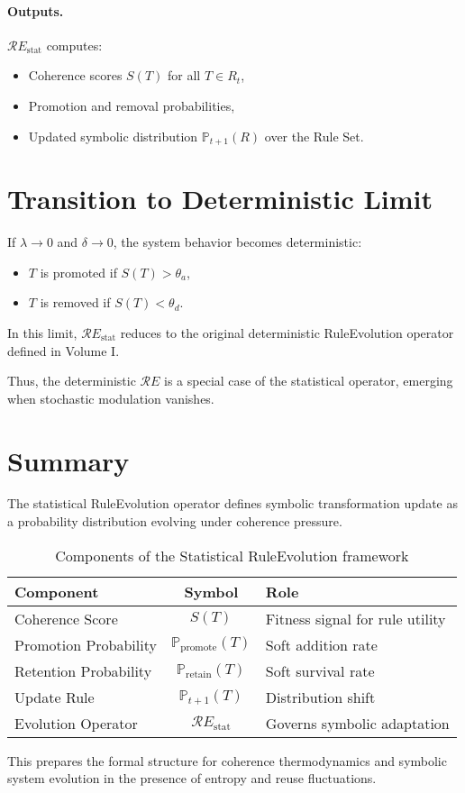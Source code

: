 \paragraph{Outputs.}
$\mathcal{R}E_{\text{stat}}$ computes:
\begin{itemize}
    \item Coherence scores $S(T)$ for all $T \in R_t$,
    \item Promotion and removal probabilities,
    \item Updated symbolic distribution $\mathbb{P}_{t+1}(R)$ over the Rule Set.
\end{itemize}

\section{Transition to Deterministic Limit} \label{transition-to-deterministic-limit}

If $\lambda \to 0$ and $\delta \to 0$, the system behavior becomes deterministic:

\begin{itemize}
    \item $T$ is promoted if $S(T) > \theta_a$,
    \item $T$ is removed if $S(T) < \theta_d$.
\end{itemize}

In this limit, $\mathcal{R}E_{\text{stat}}$ reduces to the original deterministic RuleEvolution operator defined in Volume I.

\medskip

Thus, the deterministic $\mathcal{R}E$ is a special case of the statistical operator, emerging when stochastic modulation vanishes.

\section{Summary} \label{summary-1}

The statistical RuleEvolution operator defines symbolic transformation update as a probability distribution evolving under coherence pressure.

\begin{table}[h!]
\centering
\begin{tabular}{|l|c|l|}
\hline
\textbf{Component} & \textbf{Symbol} & \textbf{Role} \\
\hline
Coherence Score         & $S(T)$                  & Fitness signal for rule utility       \\
Promotion Probability   & $\mathbb{P}_{\text{promote}}(T)$ & Soft addition rate                  \\
Retention Probability   & $\mathbb{P}_{\text{retain}}(T)$  & Soft survival rate                  \\
Update Rule             & $\mathbb{P}_{t+1}(T)$   & Distribution shift                   \\
Evolution Operator      & $\mathcal{R}E_{\text{stat}}$     & Governs symbolic adaptation         \\
\hline
\end{tabular}
\caption{Components of the Statistical RuleEvolution framework}
\end{table}

\medskip

This prepares the formal structure for coherence thermodynamics and symbolic system evolution in the presence of entropy and reuse fluctuations.
